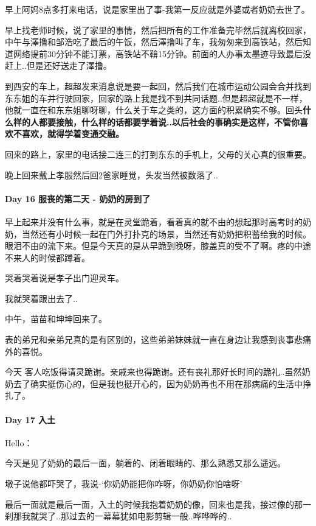 \documentclass[UTF8,a4paper,8pt]{ctexart}
\begin{document}
	     早上阿妈8点多打来电话，说是家里出了事-我第一反应就是外婆或者奶奶去世了。
	     
	     早上找老师时候，说了家里的事情，然后把所有的工作准备完毕然后就离校回家，中午与澤撸和邹浩吃了最后的午饭，然后澤撸叫了车，我匆匆来到高铁站，然后知道网络提前30分钟不能订票，高铁站不鞥15分钟。前面的人办事太墨迹导致最后没赶上..但是还好送走了澤撸。
	     
	     到西安的车上，超超发来消息说是要一起回，然后我们在城市运动公园会合并找到东东姐的车并行驶回家，回家的路上我是找不到共同话题..但是超超就是不一样，他就一直在和东东姐聊呀聊，什么关于车之类的，这方面的积累确实不够。回头\textbf{什么样的人都要接触，什么样的话都要学着说..以后社会的事确实是这样，不管你喜欢不喜欢，就得学着变通交融。}
	     
	     回来的路上，家里的电话接二连三的打到东东的手机上，父母的关心真的很重要。
	     
	     晚上回来戴上孝服然后回2爸家睡觉，头发当然被数落了..
     \paragraph{Day 16   服丧的第二天 - 奶奶的房到了   \quad     }
	     早上起来并没有什么事，就是在灵堂跪着，看着真的就不由的想起那时高考时的奶奶，当然还有小时候一起在门外打扑克的场景，当然还有奶奶把积蓄给我的时候。 眼泪不由的流下来。但是今天真的是从早跪到晚呀，膝盖真的受不了啊。疼的中途不来人的时候都蹲着。
	     
	     哭着哭着说是孝子出门迎灵车。
	     
	     我就哭着跟出去了..
	     
	     中午，苗苗和坤坤回来了。
	     
	     表的弟兄和亲弟兄真的是有区别的，这些弟弟妹妹就一直在身边让我感到丧事悲痛外的喜悦。
	     
	     今天
	     客人吃饭得请灵跪谢。亲戚来也得跪谢。还有丧礼那好长时间的跪礼..虽然奶奶去了确实挺伤心的，但是我也挺开心的，因为奶奶再也不用在那病痛的生活中挣扎了。
	     
     \paragraph{Day 17   入土   \quad     }Hello：
     
	     今天是见了奶奶的最后一面，躺着的、闭着眼睛的、那么熟悉又那么遥远。
	     
	     墩子说他都吓哭了，我说-‘你奶奶能把你咋呀，你奶奶你怕啥呀’
	     
	     最后一面就是最后一面，入土的时候我抱着奶奶的像，回来也是我，接过像的那一刹那我就哭了..那过去的一幕幕犹如电影剪辑一般..哗哗哗的..
	     
\end{document}
